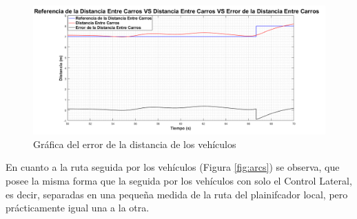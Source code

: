 \begin{figure}[H]
	\centering
		\includegraphics[scale=0.35]{Imagenes/dacc}
		\caption{Gráfica del error de la distancia de los vehículos}
		\label{fig:acdistcs}
\end{figure}	


\par En cuanto a la ruta seguida por los vehículos (Figura \ref{fig:arcs}) se observa, que posee la misma forma que la seguida por los vehículos con solo el Control Lateral, es decir, separadas en una pequeña medida de la ruta del plainifcador local, pero prácticamente igual una a la otra.\\  

